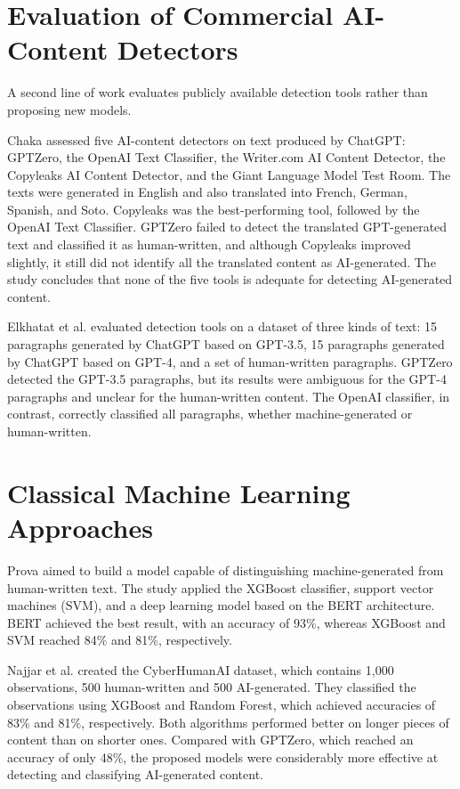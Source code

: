 \section{Evaluation of Commercial AI-Content Detectors}
\label{sec:lr_tools}

A second line of work evaluates publicly available detection tools rather than proposing new models.

Chaka \cite{chaka2023} assessed five AI-content detectors on text produced by ChatGPT: GPTZero, the OpenAI Text Classifier, the Writer.com AI Content Detector, the Copyleaks AI Content Detector, and the Giant Language Model Test Room. The texts were generated in English and also translated into French, German, Spanish, and Soto. Copyleaks was the best-performing tool, followed by the OpenAI Text Classifier. GPTZero failed to detect the translated GPT-generated text and classified it as human-written, and although Copyleaks improved slightly, it still did not identify all the translated content as AI-generated. The study concludes that none of the five tools is adequate for detecting AI-generated content.

Elkhatat et al. \cite{elkhatat2023} evaluated detection tools on a dataset of three kinds of text: 15 paragraphs generated by ChatGPT based on GPT-3.5, 15 paragraphs generated by ChatGPT based on GPT-4, and a set of human-written paragraphs. GPTZero detected the GPT-3.5 paragraphs, but its results were ambiguous for the GPT-4 paragraphs and unclear for the human-written content. The OpenAI classifier, in contrast, correctly classified all paragraphs, whether machine-generated or human-written.

\section{Classical Machine Learning Approaches}
\label{sec:lr_classical}

Prova \cite{prova2024} aimed to build a model capable of distinguishing machine-generated from human-written text. The study applied the XGBoost classifier, support vector machines (SVM), and a deep learning model based on the BERT architecture. BERT achieved the best result, with an accuracy of 93\%, whereas XGBoost and SVM reached 84\% and 81\%, respectively.

Najjar et al. \cite{najjar2025} created the CyberHumanAI dataset, which contains 1{,}000 observations, 500 human-written and 500 AI-generated. They classified the observations using XGBoost and Random Forest, which achieved accuracies of 83\% and 81\%, respectively. Both algorithms performed better on longer pieces of content than on shorter ones. Compared with GPTZero, which reached an accuracy of only 48\%, the proposed models were considerably more effective at detecting and classifying AI-generated content.

